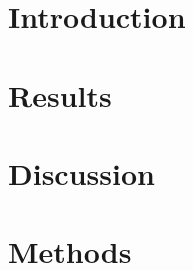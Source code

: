 \documentclass[pdflatex,sn-nature]{sn-jnl}
\begin{document}
\title{}

\abstract{}

\keywords{}

\maketitle

\section{Introduction}\label{sec:introduction}

\section{Results}\label{sec:results}

\section{Discussion}\label{sec:discussion}

\section{Methods}\label{sec:methods}



\clearpage

%

\clearpage

\end{document}
